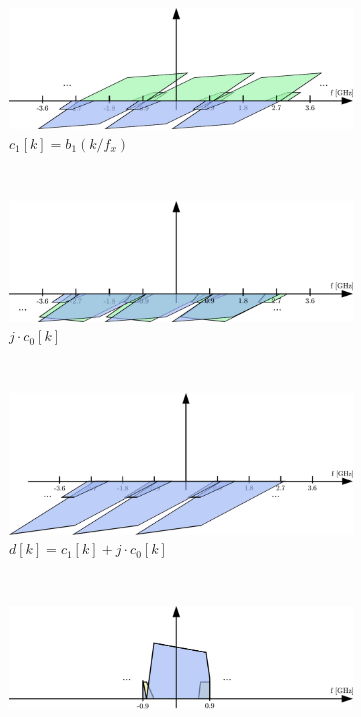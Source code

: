 \begin{figure}[h!]
\begin{subfigure}{0.45\textwidth}
    \centering
    \includegraphics[width=\textwidth]{figures/rx_2_freq_c_1}
    \caption{$c_1[k] = b_1(k / f_x)$}
    \label{fig:rx_2_freq_c_1}
  \end{subfigure}
  \vspace{4ex} \\
  \begin{subfigure}{0.45\textwidth}
    \centering
    \includegraphics[width=\textwidth]{figures/rx_2_freq_jc0}
    \caption{$j \cdot c_0[k]$}
    \label{fig:rx_2_freq_jc0}
  \end{subfigure}
  ~
  \begin{subfigure}{0.45\textwidth}
    \centering
    \includegraphics[width=\textwidth]{figures/rx_2_freq_d}
    \caption{$d[k] = c_1[k] + j \cdot c_0[k]$}
    \label{fig:rx_2_freq_d}
  \end{subfigure}
  \vspace{4ex} \\
  \begin{subfigure}{0.45\textwidth}
    \centering
    \includegraphics[width=\textwidth]{figures/rx_2_freq_e}

\end{subfigure}
\end{figure}

